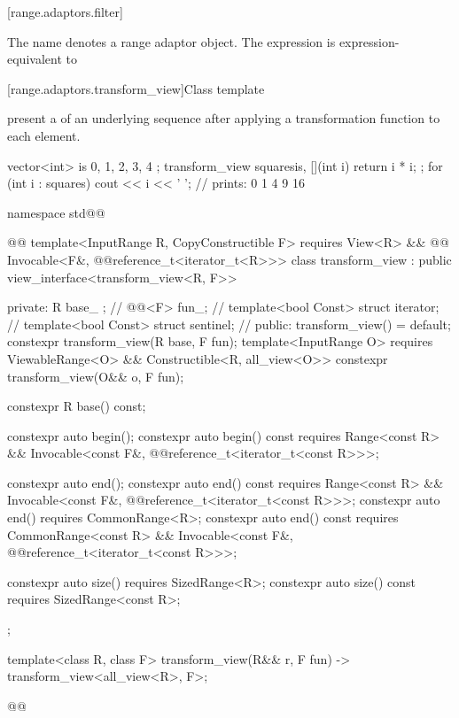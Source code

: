 [range.adaptors.filter]{}

\pnum
The name  denotes a range adaptor
object.  The expression
 
is expression-equivalent to  


[range.adaptors.transform_view]{Class template }

\pnum
{}   present
a  of an underlying sequence after
applying a transformation function to each element.

\pnum
\begin{example}
\begin{codeblock}
vector<int> is{ 0, 1, 2, 3, 4 };
transform_view squares{is, [](int i) { return i * i; }};
for (int i : squares)
  cout << i << ' '; // prints: 0 1 4 9 16
\end{codeblock}
\end{example}

\begin{codeblock}
namespace std@@ { @@
  template<InputRange R, CopyConstructible F>
    requires View<R> && @@ Invocable<F&, @@reference_t<iterator_t<R>>>
  class transform_view : public view_interface<transform_view<R, F>> {
  private:
    R base_ {};          // \expos
    @@<F> fun_; // \expos
    template<bool Const>
      struct iterator;   // \expos
    template<bool Const>
      struct sentinel;   // \expos
  public:
    transform_view() = default;
    constexpr transform_view(R base, F fun);
    template<InputRange O>
      requires ViewableRange<O> && Constructible<R, all_view<O>>
    constexpr transform_view(O&& o, F fun);

    constexpr R base() const;

    constexpr auto begin();
    constexpr auto begin() const requires Range<const R> &&
      Invocable<const F&, @@reference_t<iterator_t<const R>>>;

    constexpr auto end();
    constexpr auto end() const requires Range<const R> &&
      Invocable<const F&, @@reference_t<iterator_t<const R>>>;
    constexpr auto end() requires CommonRange<R>;
    constexpr auto end() const requires CommonRange<const R> &&
      Invocable<const F&, @@reference_t<iterator_t<const R>>>;

    constexpr auto size() requires SizedRange<R>;
    constexpr auto size() const requires SizedRange<const R>;
  };

  template<class R, class F>
  transform_view(R&& r, F fun) -> transform_view<all_view<R>, F>;
}@\oldtxt{\}}@
\end{codeblock}

